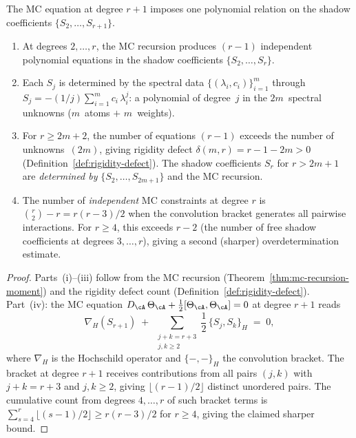 \begin{proposition}%
\label{prop:mc-constraint-counting}%
\ClaimStatusProvedHere%
%
The MC equation at degree $r{+}1$ imposes one polynomial
relation on the shadow coefficients
$\{S_2, \ldots, S_{r+1}\}$.
\begin{enumerate}[label=\textup{(\roman*)}]
\item At degrees $2, \ldots, r$, the MC recursion
 produces $(r{-}1)$ independent polynomial equations
 in the shadow coefficients $\{S_2, \ldots, S_r\}$.

\item Each $S_j$ is determined by the spectral data
 $\{(\lambda_i, c_i)\}_{i=1}^{m}$ through
 $S_j = -(1/j)\sum_{i=1}^{m} c_i\,\lambda_i^j$:
 a polynomial of degree~$j$ in the $2m$~spectral
 unknowns \textup{(}$m$~atoms $+$ $m$~weights\textup{)}.

\item For $r \ge 2m + 2$, the number of equations
 $(r{-}1)$ exceeds the number of unknowns~$(2m)$,
 giving rigidity defect
 $\delta(m,r) = r - 1 - 2m > 0$
 \textup{(}Definition~\textup{\ref{def:rigidity-defect}}\textup{)}.
 The shadow coefficients $S_r$ for $r > 2m + 1$ are
 \emph{determined by} $\{S_2, \ldots, S_{2m+1}\}$ and the
 MC recursion.

\item The number of \emph{independent} MC constraints
 at degree $r$ is $\binom{r}{2} - r = r(r{-}3)/2$
 when the convolution bracket generates all pairwise
 interactions. For $r \ge 4$, this exceeds $r{-}2$
 \textup{(}the number of free shadow coefficients at
 degrees $3, \ldots, r$\textup{)}, giving a second
 \textup{(}sharper\textup{)} overdetermination estimate.
\end{enumerate}
\end{proposition}

\begin{proof}
Parts~(i)--(iii) follow from the MC recursion
(Theorem~\ref{thm:mc-recursion-moment}) and the rigidity
defect count (Definition~\ref{def:rigidity-defect}).
Part~(iv): the MC equation
$D_\cA\,\Theta_\cA + \frac{1}{2}[\Theta_\cA,\Theta_\cA] = 0$
at degree $r{+}1$ reads
\begin{equation}\label{eq:mc-degree-expansion}
 \nabla_H(S_{r+1})
 \;+\;
 \sum_{\substack{j + k = r+3 \\ j, k \ge 2}}
 \frac{1}{2}\,\{S_j, S_k\}_H
 \;=\; 0,
\end{equation}
where $\nabla_H$ is the Hochschild operator and
$\{-,-\}_H$ the convolution bracket. The bracket
at degree $r{+}1$ receives contributions from all pairs
$(j,k)$ with $j + k = r + 3$ and $j, k \ge 2$, giving
$\lfloor(r{-}1)/2\rfloor$ distinct unordered pairs.
The cumulative count from degrees $4, \ldots, r$ of such
bracket terms is
$\sum_{s=4}^{r} \lfloor(s{-}1)/2\rfloor
\ge r(r{-}3)/2$ for $r \ge 4$, giving the claimed
sharper bound.
\end{proof}

